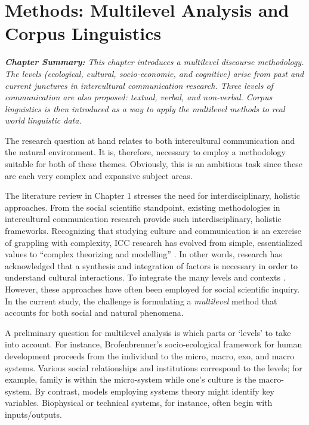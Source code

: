 \chapter{Methods: Multilevel Analysis and Corpus Linguistics}

\textit{\textbf{Chapter Summary:} This chapter introduces a multilevel discourse methodology. The levels (ecological, cultural, socio-economic, and cognitive) arise from past and current junctures in intercultural communication research. Three levels of communication are also proposed: textual, verbal, and non-verbal. Corpus linguistics is then introduced as a way to apply the multilevel methods to real world linguistic data.}
\newline

The research question at hand relates to both intercultural communication and the natural environment. It is, therefore, necessary to employ a methodology suitable for both of these themes. Obviously, this is an ambitious task since these are each very complex and expansive subject areas.    

The literature review in Chapter 1 stresses the need for interdisciplinary, holistic approaches. From the social scientific standpoint, existing methodologies in intercultural communication research provide such interdisciplinary, holistic frameworks. Recognizing that studying culture and communication is an exercise of grappling with complexity, ICC research has evolved from simple, essentialized values to ``complex theorizing and modelling'' \citep[186]{Oetzel2007a}. In other words, research has acknowledged that a synthesis and integration of factors is necessary in order to understand cultural interactions. To integrate the many levels and contexts . However, these approaches have often been employed for social scientific inquiry. In the current study, the challenge is formulating a \textit{multilevel} method that accounts for both social and natural phenomena.  

A preliminary question for multilevel analysis is which parts or `levels' to take into account. For instance, Brofenbrenner's socio-ecological framework for human development proceeds from the individual to the micro, macro, exo, and macro systems. Various social relationships and institutions correspond to the levels; for example, family is within the micro-system while one's culture is the macro-system. By contrast, models employing systems theory might identify key variables. Biophysical or technical systems, for instance, often begin with inputs/outputs. 

